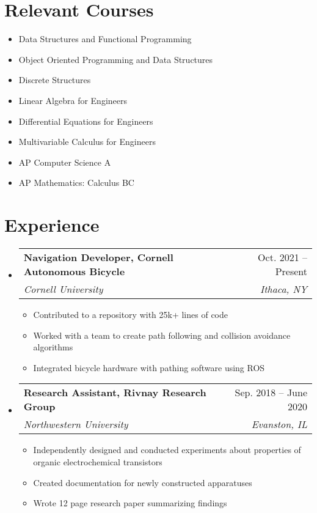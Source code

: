 \documentclass[letterpaper,11pt]{article}
\makeatletter
\newcommand{\resumeItem}[1]{
  \item\small{
    {#1 \vspace{-2pt}}
  }
}
\newcommand{\resumeSubheading}[4]{
  \vspace{-2pt}\item
    \begin{tabular*}{0.97\textwidth}[t]{l@{\extracolsep{\fill}}r}
      \textbf{#1} & #2 \\
      \textit{\small#3} & \textit{\small #4} \\
    \end{tabular*}\vspace{-7pt}
}
\newcommand{\resumeSubHeadingListStart}{\begin{itemize}[leftmargin=0.15in, label={}]}
\newcommand{\resumeSubHeadingListEnd}{\end{itemize}}
\newcommand{\resumeItemListStart}{\begin{itemize}}
\newcommand{\resumeItemListEnd}{\end{itemize}\vspace{-5pt}}
\makeatother
\begin{document}
\section{Relevant Courses}
  \begin{multicols}{2}\small
    \begin{itemize}
      \item Data Structures and Functional Programming
      \item Object Oriented Programming and Data Structures
      \item Discrete Structures
      \item Linear Algebra for Engineers
      \item Differential Equations for Engineers
      \item Multivariable Calculus for Engineers
      \item AP Computer Science A
      \item AP Mathematics: Calculus BC
    \end{itemize}\normalsize
  \end{multicols}
  


\section{Experience}
  \resumeSubHeadingListStart

    \resumeSubheading
      {Navigation Developer, Cornell Autonomous Bicycle}{Oct. 2021 -- Present}
      {Cornell University}{Ithaca, NY}
      \resumeItemListStart
        \resumeItem{Contributed to a repository with 25k+ lines of code}
        \resumeItem{Worked with a team to create path following and collision avoidance algorithms}
        \resumeItem{Integrated bicycle hardware with pathing software using ROS}
      \resumeItemListEnd

    \resumeSubheading
      {Research Assistant, Rivnay Research Group}{Sep. 2018 -- June 2020}
      {Northwestern University}{Evanston, IL}
      \resumeItemListStart
        \resumeItem{Independently designed and conducted experiments about properties of organic electrochemical transistors}
        \resumeItem{Created documentation for newly constructed apparatuses}
        \resumeItem{Wrote 12 page research paper summarizing findings}
    \resumeItemListEnd

  \resumeSubHeadingListEnd


\end{document}

